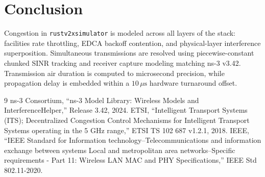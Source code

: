 \documentclass[11pt,a4paper]{article}
\begin{document}
\section{Conclusion}
Congestion in \texttt{rustv2xsimulator} is modeled across all layers of the stack: facilities rate throttling, EDCA backoff contention, and physical-layer interference superposition. Simultaneous transmissions are resolved using piecewise-constant chunked SINR tracking and receiver capture modeling matching ns-3 v3.42. Transmission air duration is computed to microsecond precision, while propagation delay is embedded within a $10\,\mu\mathrm{s}$ hardware turnaround offset.

\begin{thebibliography}{9}
ns-3 Consortium, ``ns-3 Model Library: Wireless Models and InterferenceHelper,'' Release 3.42, 2024.
ETSI, ``Intelligent Transport Systems (ITS); Decentralized Congestion Control Mechanisms for Intelligent Transport Systems operating in the 5 GHz range,'' ETSI TS 102 687 v1.2.1, 2018.
IEEE, ``IEEE Standard for Information technology--Telecommunications and information exchange between systems Local and metropolitan area networks--Specific requirements - Part 11: Wireless LAN MAC and PHY Specifications,'' IEEE Std 802.11-2020.
\end{thebibliography}
\end{document}
